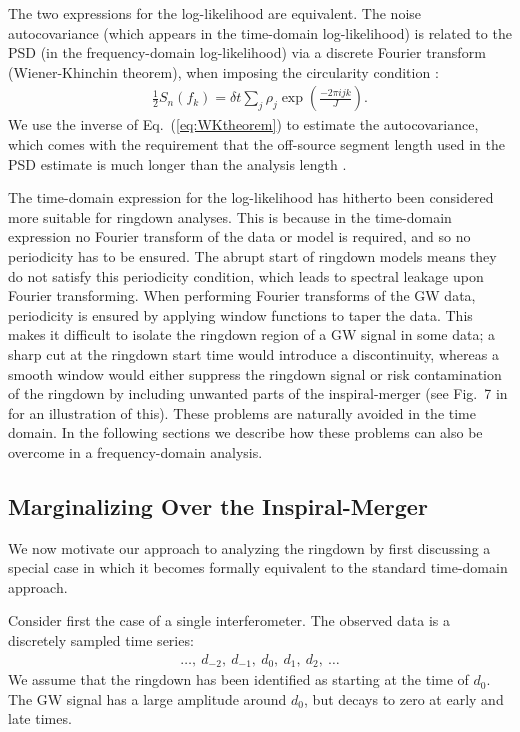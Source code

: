 The two expressions for the log-likelihood are equivalent.
The noise autocovariance (which appears in the time-domain log-likelihood) is related to the PSD (in the frequency-domain log-likelihood) via a discrete Fourier transform (Wiener-Khinchin theorem), when imposing the circularity condition \cite{Isi:2021iql}:
\begin{align} \label{eq:WKtheorem}
	\frac{1}{2}S_n(f_k) = \delta t \sum_{j}\rho_j \exp\left(\frac{-2\pi ijk}{J}\right).
\end{align}
We use the inverse of Eq.~(\ref{eq:WKtheorem}) to estimate the autocovariance, which comes with the requirement that the off-source segment length used in the PSD estimate is much longer than the analysis length \cite{Isi:2021iql}.

The time-domain expression for the log-likelihood has hitherto been considered more suitable for ringdown analyses.
This is because in the time-domain expression no Fourier transform of the data or model is required, and so no periodicity has to be ensured.
The abrupt start of ringdown models means they do not satisfy this periodicity condition, which leads to spectral leakage upon Fourier transforming. 
When performing Fourier transforms of the GW data, periodicity is ensured by applying window functions to taper the data.
This makes it difficult to isolate the ringdown region of a GW signal in some data; a sharp cut at the ringdown start time would introduce a discontinuity, whereas a smooth window would either suppress the ringdown signal or risk contamination of the ringdown by including unwanted parts of the inspiral-merger (see Fig.~7 in \cite{Isi:2021iql} for an illustration of this). These problems are naturally avoided in the time domain. 
In the following sections we describe how these problems can also be overcome in a frequency-domain analysis.


\subsection{Marginalizing Over the Inspiral-Merger}\label{subsec:motivation}

We now motivate our approach to analyzing the ringdown by first discussing a special case in which it becomes formally equivalent to the standard time-domain approach. 

Consider first the case of a single interferometer.
The observed data is a discretely sampled time series:
\begin{align}
	\ldots,\ d_{-2},\ d_{-1},\ d_{0},\ d_{1},\ d_{2},\ \ldots
\end{align}
We assume that the ringdown has been identified as starting at the time of $d_0$.
The GW signal has a large amplitude around $d_0$, but decays to zero at early and late times.

